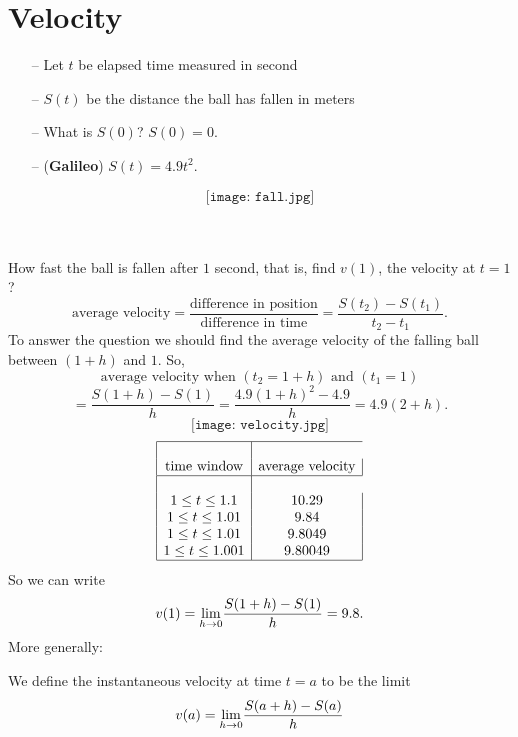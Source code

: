\documentclass[12pt,a4paper]{book}
\numberwithin{equation}{section}
\begin{document}
\section{Velocity}

\noindent\begin{minipage}{0.5\textwidth} 
	\begin{itemize}
		\item[--] Let $t$ be elapsed time measured in second
		\item[--] $S(t)$ be the distance the ball has fallen in meters
		\item[--] What is $S(0)$? $S(0)=0$.
		\item[--] ({\bf Galileo}) $S(t)=4.9t^2$.
	\end{itemize}

\end{minipage}
\hfill
\begin{minipage}{0.5\textwidth}\raggedleft
$$	\texttt{[image: fall.jpg]} $$
\end{minipage} 
\\
\\
 How fast the ball is fallen after $1$ second, that is,  find $v(1)$, the velocity at $t=1$ ?
$$
\text{average velocity}=\frac{\text{difference in position}}{\text{difference in time}}=\frac{S(t_2)-S(t_1)}{t_2-t_1}.
$$
To answer the question we should find the average velocity of the falling ball between $(1+h)$ and $1$. So,
$$
\text{average velocity when $(t_2=1+h)$ and $(t_1=1)$}$$
$$=\frac{S(1+h)-S(1)}{h}=\frac{4.9(1+h)^2-4.9}{h}=4.9(2+h).
$$
$$
\texttt{[image: velocity.jpg]}
$$
$$
\begin{array}{|c|c|}
\hline\\
\text{time window} & \text{average velocity}\\
\hline\\
1\leq t\leq 1.1 & 10.29\\
1\leq t\leq 1.01 & 9.84\\
1\leq t\leq 1.01  & 9.8049\\
1\leq t\leq 1.001  & 9.80049\\
\hline
\end{array}
$$
So we can write 
$$v(1)= \underset{h\rightarrow 0}{\rm lim} \frac{S(1+h)-S(1)}{h}=9.8.$$
	More generally:
 \begin{mdframed}
We define the instantaneous velocity at time $t=a$ to be the limit 
	$$v(a)= \underset{h\rightarrow 0}{\rm lim} \frac{S(a+h)-S(a)}{h}$$
 \end{mdframed}
\end{document}
